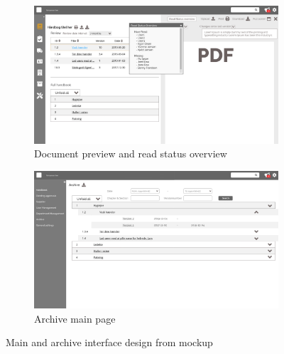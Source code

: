 \begin{figure}[H]\ContinuedFloat
	\centering
	\begin{subfigure}[b]{0.48\textwidth}
		\includegraphics[width=\textwidth]{billeder/iteration3Prototyper/Page_15.jpg}
		\caption{Document preview and read status overview}
		\label{fig:5-PreviewRead}
	\end{subfigure}
	\quad
	\begin{subfigure}[b]{0.48\textwidth}
		\includegraphics[width=\textwidth]{billeder/iteration3Prototyper/Page_16.jpg}
		\caption{Archive main page}
		\label{fig:5-Archive}
	\end{subfigure}
	\caption{Main and archive interface design from mockup}\label{fig:5-GeneralMockUp}
\end{figure}

